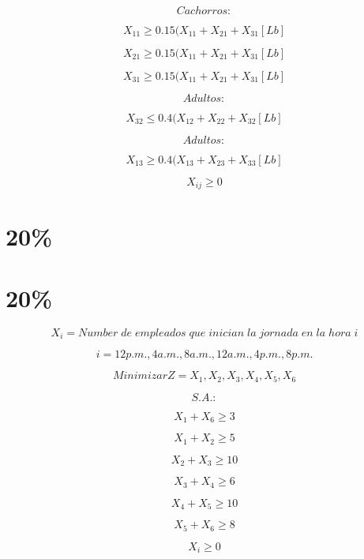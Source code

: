 \documentclass[12pt, letterpaper, twoside]{article}
\begin{document}
      \[ Cachorros:  \]

      \[ X_{11} \geq 0.15 (X_{11} + X_{21} + X_{31} [Lb]  \]

      \[ X_{21} \geq 0.15 (X_{11} + X_{21} + X_{31} [Lb]  \]

      \[ X_{31} \geq 0.15 (X_{11} + X_{21} + X_{31} [Lb]  \]

     \[ Adultos:  \]

      \[ X_{32} \leq 0.4 (X_{12} + X_{22} + X_{32} [Lb]  \]

     \[ Adultos:  \]

      \[ X_{13} \geq 0.4 (X_{13} + X_{23} + X_{33} [Lb]  \]

     \[ X_{ij} \geq 0\]

    \section{20\%}



    \section{20\%}

    \[  X_i = Number\;de\;empleados\;que\;inician\;la\;jornada\;en\;la\;hora\; i \]
  
    \[ i = 12 p.m., 4 a.m.,  8 a.m., 12 a.m., 4 p.m., 8  p.m. \]

    \[ Minimizar Z = X_1, X_2, X_3, X_4, X_5, X_6  \]

    \[ S.A.:  \]

    \[  X_1 + X_6 \geq 3  \]

    \[  X_1 + X_2 \geq 5 \]

    \[  X_2 + X_3 \geq 10 \]

    \[  X_3 + X_4 \geq 6 \]

    \[  X_4 + X_5 \geq 10 \]

    \[  X_5 + X_6 \geq 8 \]

    \[  X_i \geq 0 \]
\end{document}
